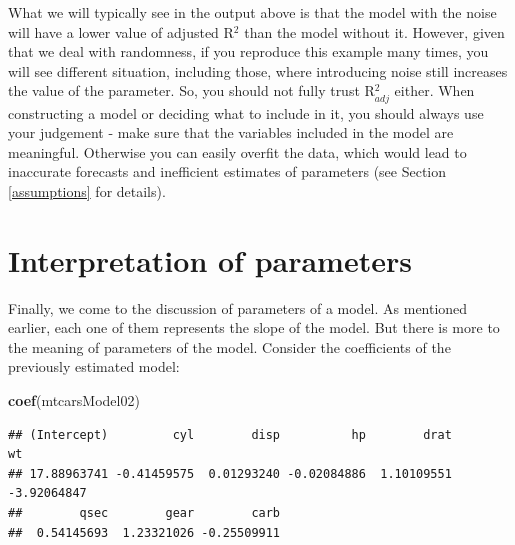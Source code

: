 \documentclass[
]{book}
\newenvironment{Shaded}{\begin{snugshade}}{\end{snugshade}}
\newcommand{\KeywordTok}[1]{\textcolor[rgb]{0.13,0.29,0.53}{\textbf{#1}}}
\newcommand{\NormalTok}[1]{#1}
\theoremstyle{definition}
\theoremstyle{definition}
\theoremstyle{definition}
\theoremstyle{definition}
\theoremstyle{remark}
\begin{document}
What we will typically see in the output above is that the model with the noise will have a lower value of adjusted R\(^2\) than the model without it. However, given that we deal with randomness, if you reproduce this example many times, you will see different situation, including those, where introducing noise still increases the value of the parameter. So, you should not fully trust R\(^2_{adj}\) either. When constructing a model or deciding what to include in it, you should always use your judgement - make sure that the variables included in the model are meaningful. Otherwise you can easily overfit the data, which would lead to inaccurate forecasts and inefficient estimates of parameters (see Section \ref{assumptions} for details).

\hypertarget{interpretation-of-parameters}{%
\section{Interpretation of parameters}\label{interpretation-of-parameters}}

Finally, we come to the discussion of parameters of a model. As mentioned earlier, each one of them represents the slope of the model. But there is more to the meaning of parameters of the model. Consider the coefficients of the previously estimated model:

\begin{Shaded}
\begin{Highlighting}[]
\KeywordTok{coef}\NormalTok{(mtcarsModel02)}
\end{Highlighting}
\end{Shaded}

\begin{verbatim}
## (Intercept)         cyl        disp          hp        drat          wt 
## 17.88963741 -0.41459575  0.01293240 -0.02084886  1.10109551 -3.92064847 
##        qsec        gear        carb 
##  0.54145693  1.23321026 -0.25509911
\end{verbatim}
\end{document}
